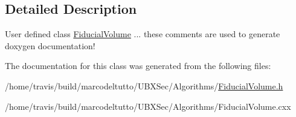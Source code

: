 \subsection{Detailed Description}
User defined class \hyperlink{classubana_1_1FiducialVolume}{Fiducial\-Volume} ... these comments are used to generate doxygen documentation! 

The documentation for this class was generated from the following files\-:\begin{DoxyCompactItemize}
\item 
/home/travis/build/marcodeltutto/\-U\-B\-X\-Sec/\-Algorithms/\hyperlink{FiducialVolume_8h}{Fiducial\-Volume.\-h}\item 
/home/travis/build/marcodeltutto/\-U\-B\-X\-Sec/\-Algorithms/Fiducial\-Volume.\-cxx\end{DoxyCompactItemize}
